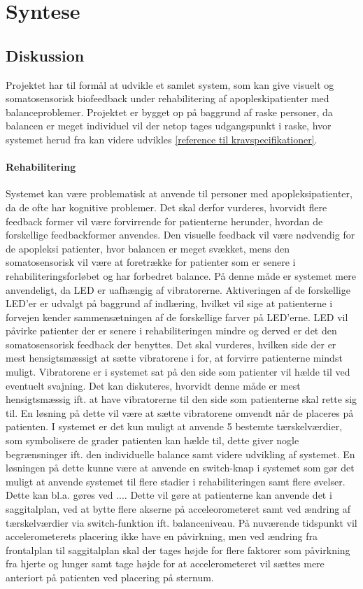 \chapter{Syntese}
\section{Diskussion}
Projektet har til formål at udvikle et samlet system, som kan give visuelt og somatosensorisk biofeedback under rehabilitering af apopleskipatienter med balanceproblemer. Projektet er bygget op på baggrund af raske personer, da balancen er meget individuel vil der netop tages udgangspunkt i raske, hvor systemet herud fra kan videre udvikles \ref{reference til kravspecifikationer}. 

\subsubsection{Rehabilitering}
Systemet kan være problematisk at anvende til personer med apopleksipatienter, da de ofte har kognitive problemer. Det skal derfor vurderes, hvorvidt flere feedback former vil være forvirrende for patienterne herunder, hvordan de forskellige feedbackformer anvendes. Den visuelle feedback vil være nødvendig for de apopleksi patienter, hvor balancen er meget svækket, mens den somatosensorisk vil være at foretrække for patienter som er senere i rehabiliteringsforløbet og har forbedret balance. På denne måde er systemet mere anvendeligt, da LED er uafhængig af vibratorerne. Aktiveringen af de forskellige LED'er er udvalgt på baggrund af indlæring, hvilket vil sige at patienterne i forvejen kender sammensætningen af de forskellige farver på LED'erne.
LED vil påvirke patienter der er senere i rehabiliteringen mindre og derved er det den somatosensorisk feedback der benyttes. Det skal vurderes, hvilken side der er mest hensigtsmæssigt at sætte vibratorene i for, at forvirre patienterne mindst muligt. Vibratorene er i systemet sat på den side som patienter vil hælde til ved eventuelt svajning. Det kan diskuteres, hvorvidt denne måde er mest hensigtsmæssig ift. at have vibratorerne til den side som patienterne skal rette sig til. En løsning på dette vil være at sætte vibratorene omvendt når de placeres på patienten. 
I systemet er det kun muligt at anvende 5 bestemte  tærskelværdier, som symbolisere de grader patienten kan hælde til, dette giver nogle begrænsninger ift. den individuelle balance samt videre udvikling af systemet. En løsningen på dette kunne være at anvende en switch-knap  i systemet som gør det muligt at anvende systemet til flere stadier i rehabiliteringen samt flere øvelser. Dette kan bl.a. gøres ved .... Dette vil gøre at patienterne kan anvende det i saggitalplan, ved at bytte flere akserne på acceleorometeret samt ved ændring af tærskelværdier via switch-funktion ift. balanceniveau. På nuværende tidspunkt vil accelerometerets placering ikke have en påvirkning, men ved ændring fra frontalplan til saggitalplan skal der tages højde for flere faktorer som påvirkning fra hjerte og lunger samt tage højde for at accelerometeret vil sættes mere anteriort på patienten ved placering på sternum. 

